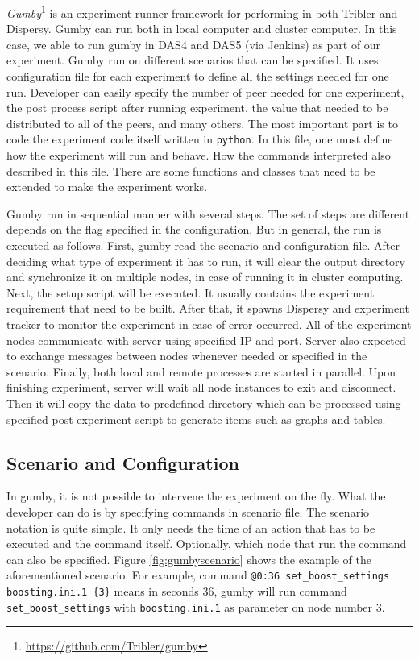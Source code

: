 \textit{Gumby}\footnote{\url{https://github.com/Tribler/gumby}} is an experiment runner framework for performing in both Tribler and Dispersy. Gumby can run both in local computer and cluster computer. In this case, we able to run gumby in DAS4 and DAS5 (via Jenkins) as part of our experiment. Gumby run on different scenarios that can be specified. It uses configuration file for each experiment to define all the settings needed for one run. Developer can easily specify the number of peer needed for one experiment, the post process script after running experiment, the value that needed to be distributed to all of the peers, and many others. The most important part is to code the experiment code itself written in \texttt{python}. In this file, one must define how the experiment will run and behave. How the commands interpreted also described in this file. There are some functions and classes that need to be extended to make the experiment works.

Gumby run in sequential manner with several steps. The set of steps are different depends on the flag specified in the configuration. But in general, the run is executed as follows. First, gumby read the scenario and configuration file. After deciding what type of experiment it has to run, it will clear the output directory and synchronize it on multiple nodes, in case of running it in cluster computing. Next, the setup script will be executed. It usually contains the experiment requirement that need to be built. After that, it spawns Dispersy and experiment tracker to monitor the experiment in case of error occurred. All of the experiment nodes communicate with server using specified IP and port. Server also expected to exchange messages between nodes whenever needed or specified in the scenario. Finally, both local and remote processes are started in parallel. Upon finishing experiment, server will wait all node instances to exit and disconnect. Then it will copy the data to predefined directory which can be processed using specified post-experiment script to generate items such as graphs and tables.

\subsection{Scenario and Configuration}
In gumby, it is not possible to intervene the experiment on the fly. What the developer can do is by specifying commands in scenario file. The scenario notation is quite simple. It only needs the time of an action that has to be executed and the command itself. Optionally, which node that run the command can also be specified. Figure \ref{fig:gumbyscenario} shows the example of the aforementioned scenario. For example, command \texttt{@0:36 set\_boost\_settings boosting.ini.1 \{3\}} means in seconds 36, gumby will run command \texttt{set\_boost\_settings} with \texttt{boosting.ini.1} as parameter on node number 3. 


